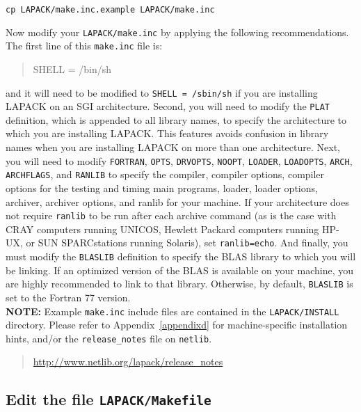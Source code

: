 \documentclass[11pt]{report}
\begin{document}
\begin{list}{}
\item{\texttt{cp LAPACK/make.inc.example LAPACK/make.inc}}
\end{list}

\noindent
Now modify your \texttt{LAPACK/make.inc} by applying the following recommendations.
The first line of this \texttt{make.inc} file is:
\begin{quote}
SHELL = /bin/sh
\end{quote}
and it will need to be modified to \texttt{SHELL = /sbin/sh} if you are
installing LAPACK on an SGI architecture.
Second, you will
need to modify the \texttt{PLAT} definition, which is appended to all
library names, to specify the architecture to which you are installing
LAPACK.  This features avoids confusion in library names when you are
installing LAPACK on more than one architecture.  Next, you will need
to modify \texttt{FORTRAN}, \texttt{OPTS}, \texttt{DRVOPTS}, \texttt{NOOPT}, \texttt{LOADER},
\texttt{LOADOPTS}, \texttt{ARCH}, \texttt{ARCHFLAGS}, and \texttt{RANLIB} to specify
the compiler, compiler options, compiler options for the testing and
timing main programs, loader, loader options, archiver,
archiver options, and ranlib for your machine.  If your architecture
does not require \texttt{ranlib} to be run after each archive command (as
is the case with CRAY computers running UNICOS, Hewlett Packard
computers running HP-UX, or SUN SPARCstations running Solaris), set
\texttt{ranlib=echo}.  And finally, you must
modify the \texttt{BLASLIB} definition to specify the BLAS library to which
you will be linking.  If an optimized version of the BLAS is available
on your machine, you are highly recommended to link to that library.
Otherwise, by default, \texttt{BLASLIB} is set to the Fortran 77 version.  \\

\textbf{NOTE:}  Example \texttt{make.inc} include files are contained in the
\texttt{LAPACK/INSTALL} directory.  Please refer to
Appendix~\ref{appendixd} for machine-specific installation hints, and/or
the \texttt{release\_notes} file on \texttt{netlib}.
\begin{quote}
\url{http://www.netlib.org/lapack/release\_notes}
\end{quote}

\subsection{Edit the file \texttt{LAPACK/Makefile}}\label{toplevelmakefile}
\end{document}
